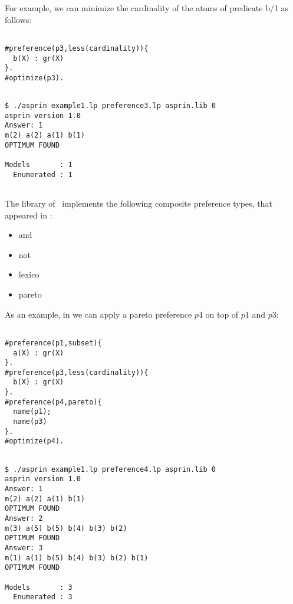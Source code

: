 
For example, we can minimize the cardinality of the atoms of predicate b/1 as follows: 
\begin{lstlisting}[numbers=none]

#preference(p3,less(cardinality)){                                                                                             
  b(X) : gr(X)                                                                                                    
}.
#optimize(p3).
\end{lstlisting}
\begin{lstlisting}[numbers=none]

$ ./asprin example1.lp preference3.lp asprin.lib 0
asprin version 1.0
Answer: 1
m(2) a(2) a(1) b(1)
OPTIMUM FOUND

Models       : 1
  Enumerated : 1
  
\end{lstlisting}

The library of  \asprin\ implements the following composite preference types,  
that appeared in \cite{sonpon06a}:
\begin{itemize}
	\item  and   
	\item  not    
	\item  lexico   
	\item  pareto  
\end{itemize}

%

As an example, in  we can apply a pareto preference $p4$ on top of $p1$ and $p3$: 
\begin{lstlisting}[numbers=none]

#preference(p1,subset){                                                                                             
  a(X) : gr(X)                                                                                                    
}.
#preference(p3,less(cardinality)){                                                                                             
  b(X) : gr(X)                                                                                                    
}.
#preference(p4,pareto){
  name(p1);
  name(p3)
}.
#optimize(p4).
\end{lstlisting}
\begin{lstlisting}[numbers=none]

$ ./asprin example1.lp preference4.lp asprin.lib 0
asprin version 1.0
Answer: 1
m(2) a(2) a(1) b(1)
OPTIMUM FOUND
Answer: 2
m(3) a(5) b(5) b(4) b(3) b(2)
OPTIMUM FOUND
Answer: 3
m(1) a(1) b(5) b(4) b(3) b(2) b(1)
OPTIMUM FOUND

Models       : 3
  Enumerated : 3

\end{lstlisting}


